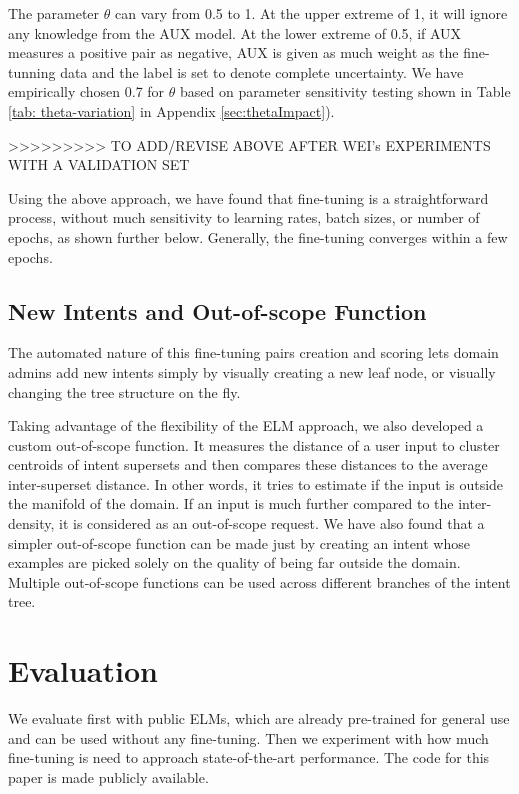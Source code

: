 \documentclass[sigconf, anonymous=true]{acmart}
\begin{document}
The parameter $\theta$ can vary from 0.5 to 1. At the upper extreme of 1, it will ignore any knowledge from the AUX model. At the lower extreme of 0.5, if AUX measures a positive pair as negative, AUX is given as much weight as the fine-tunning data and the label is set to denote complete uncertainty. We have empirically chosen 0.7 for $\theta$ based on parameter sensitivity testing shown in Table \ref{tab: theta-variation} in Appendix \ref{sec:thetaImpact}). 

>>>>>>>>> TO ADD/REVISE ABOVE AFTER WEI's EXPERIMENTS WITH A VALIDATION SET


Using the above approach, we have found that fine-tuning is a straightforward process, without much sensitivity to learning rates, batch sizes, or number of epochs, as shown further below. Generally, the fine-tuning converges within a few epochs. 

\subsection{New Intents and Out-of-scope Function}
The automated nature of this fine-tuning pairs creation and scoring lets domain admins add new intents simply by visually creating a new leaf node, or visually changing the tree structure on the fly.  

Taking advantage of the flexibility of the ELM approach, we also developed a custom out-of-scope function. It measures the distance of a user input to cluster centroids of intent supersets and then compares these distances to the average inter-superset distance. In other words, it tries to estimate if the input is outside the manifold of the domain. If an input is much further compared to the inter-density, it is considered as an out-of-scope request. We have also found that a simpler out-of-scope function can be made just by creating an intent whose examples are picked solely on the quality of being far outside the domain. Multiple out-of-scope functions can be used across different branches of the intent tree. 


\section{Evaluation}
We evaluate first with public ELMs, which are already pre-trained for general use and can be used without any fine-tuning. Then we experiment with how much fine-tuning is need to approach state-of-the-art performance. The code for this paper is made publicly available. 
\end{document}
